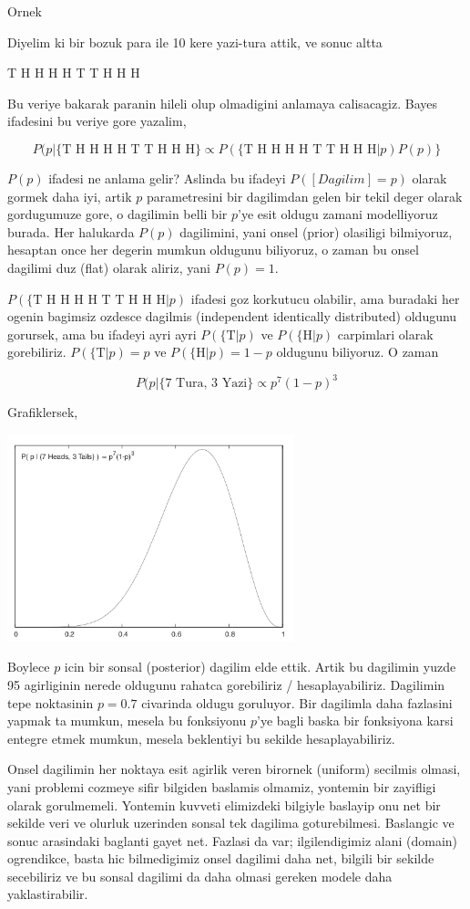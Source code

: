 \documentclass[12pt,fleqn]{article}\usepackage{../common}
\begin{document}
Ornek

Diyelim ki bir bozuk para ile 10 kere yazi-tura attik, ve sonuc altta

T H H H H T T H H H

Bu veriye bakarak paranin hileli olup olmadigini anlamaya
calisacagiz. Bayes ifadesini bu veriye gore yazalim,

$$ P(p | \{ \textrm{T H H H H T T H H H} \} \propto 
P(\{ \textrm{T H H H H T T H H H} | p) P(p) \}
$$

$P(p)$ ifadesi ne anlama gelir? Aslinda bu ifadeyi $P([Dagilim] = p)$
olarak gormek daha iyi, artik $p$ parametresini bir dagilimdan gelen bir
tekil deger olarak gordugumuze gore, o dagilimin belli bir $p$'ye esit
oldugu zamani modelliyoruz burada. Her halukarda $P(p)$ dagilimini, yani
onsel (prior) olasiligi bilmiyoruz, hesaptan once her degerin mumkun
oldugunu biliyoruz, o zaman bu onsel dagilimi duz (flat) olarak aliriz,
yani $P(p) = 1$. 

$P(\{\textrm{T H H H H T T H H H} | p)$ ifadesi goz korkutucu olabilir, ama
buradaki her ogenin bagimsiz ozdesce dagilmis (independent identically
distributed) oldugunu gorursek, ama bu ifadeyi ayri ayri
$P(\{\textrm{T}|p)$ ve $P(\{\textrm{H}|p)$ carpimlari olarak gorebiliriz. $P(\{\textrm{T}|p) = p$ ve 
$P(\{\textrm{H}|p)=1-p$ oldugunu biliyoruz. O zaman 

$$ P(p | \{ \textrm{7 Tura, 3 Yazi} \} \propto
p^7(1-p)^3
$$

Grafiklersek, 

\includegraphics[height=6cm]{05_01.png}

Boylece $p$ icin bir sonsal (posterior) dagilim elde ettik. Artik bu
dagilimin yuzde 95 agirliginin nerede oldugunu rahatca gorebiliriz /
hesaplayabiliriz. Dagilimin tepe noktasinin $p=0.7$ civarinda oldugu
goruluyor. Bir dagilimla daha fazlasini yapmak ta mumkun, mesela bu
fonksiyonu $p$'ye bagli baska bir fonksiyona karsi entegre etmek mumkun,
mesela beklentiyi bu sekilde hesaplayabiliriz. 

Onsel dagilimin her noktaya esit agirlik veren birornek (uniform) secilmis
olmasi, yani problemi cozmeye sifir bilgiden baslamis olmamiz, yontemin bir
zayifligi olarak gorulmemeli. Yontemin kuvveti elimizdeki bilgiyle baslayip
onu net bir sekilde veri ve olurluk uzerinden sonsal tek dagilima
goturebilmesi. Baslangic ve sonuc arasindaki baglanti gayet net. Fazlasi da
var; ilgilendigimiz alani (domain) ogrendikce, basta hic bilmedigimiz onsel
dagilimi daha net, bilgili bir sekilde secebiliriz ve bu sonsal dagilimi da
daha olmasi gereken modele daha yaklastirabilir. 
\end{document}
